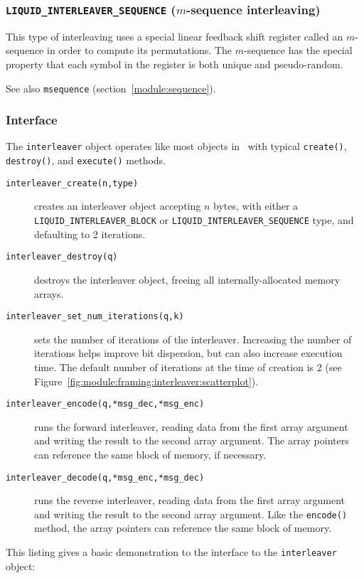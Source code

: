 
\subsubsection{{\tt LIQUID\_INTERLEAVER\_SEQUENCE} ($m$-sequence interleaving)}
\label{module:framing:interleaver:sequence}
This type of interleaving uses a special linear feedback shift register called
an $m$-sequence in order to compute its permutations.
The $m$-sequence has the special property that each symbol in the register is
both unique and pseudo-random.


See also {\tt msequence} (section~\ref{module:sequence}).

\subsubsection{Interface}
\label{module:framing:interleaver:interface}
The {\tt interleaver} object operates like most objects in \liquid\ with
typical {\tt create()}, {\tt destroy()}, and {\tt execute()} methods.

\begin{description}
\item[{\tt interleaver\_create(n,type)}]
    creates an interleaver object accepting $n$ bytes,
    with either a {\tt LIQUID\_INTERLEAVER\_BLOCK} or
    {\tt LIQUID\_INTERLEAVER\_SEQUENCE} type, and 
    defaulting to 2 iterations.
\item[{\tt interleaver\_destroy(q)}]
    destroys the interleaver object, freeing all internally-allocated
    memory arrays.
\item[{\tt interleaver\_set\_num\_iterations(q,k)}]
    sets the number of iterations of the interleaver.
    Increasing the number of iterations helps improve bit dispersion, but can
    also increase execution time.
    The default number of iterations at the time of creation is 2 (see
    Figure~\ref{fig:module:framing:interleaver:scatterplot}).
\item[{\tt interleaver\_encode(q,*msg\_dec,*msg\_enc)}]
    runs the forward interleaver, reading data from the first array argument
    and writing the result to the second array argument.
    The array pointers can reference the same block of memory, if necessary.
\item[{\tt interleaver\_decode(q,*msg\_enc,*msg\_dec)}]
    runs the reverse interleaver, reading data from the first array argument
    and writing the result to the second array argument.
    Like the {\tt encode()} method, the array pointers can reference the same
    block of memory.
\end{description}
%
This listing gives a basic demonstration to the interface to the
{\tt interleaver} object:
%


